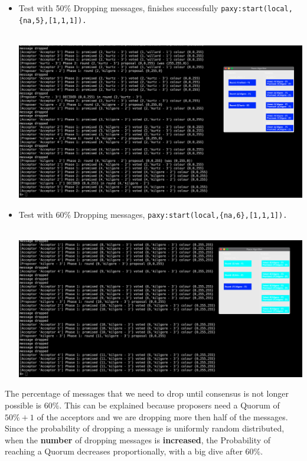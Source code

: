 \documentclass[a4paper, 10pt]{article}
\begin{document}
\begin{itemize}
\begin{minipage}[t]{\linewidth}
\end{minipage}
\item Test with 50\% Dropping messages, finishes successfully \lstinline|paxy:start(local,{na,5},[1,1,1]).|\\\\
  \begin{minipage}[t]{\linewidth}
    \includegraphics[width=\textwidth]{drop5}
  \end{minipage}
\item Test with 60\% Dropping messages, \color{red}{No consensus reached} \lstinline|paxy:start(local,{na,6},[1,1,1]).|\\\\
  \begin{minipage}[t]{\linewidth}
    \includegraphics[width=\textwidth]{drop6}
  \end{minipage}
\end{itemize}
The percentage of messages that we need to drop until consensus is not longer
possible is $60\%$. This can be explained because proposers need a Quorum of $50\%
+ 1$ of the acceptors and we are dropping more then half of the messages. Since the probability of dropping a message is uniformly random distributed, when the \textbf{number} of dropping messages is \textbf{increased}, the Probability of reaching a Quorum decreases proportionally, with a big dive after $60\%$.
\\\\
     
\end{document}
